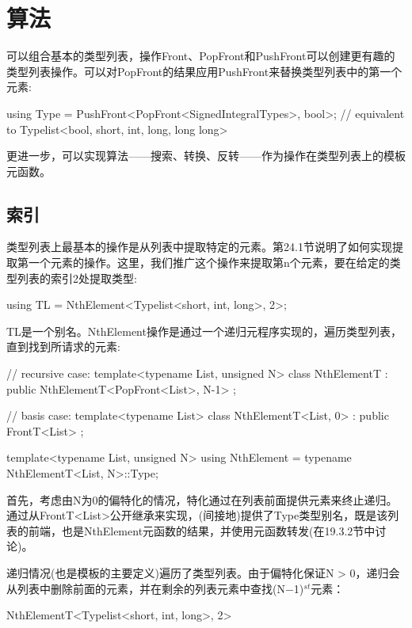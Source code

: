 \section{算法}

可以组合基本的类型列表，操作Front、PopFront和PushFront可以创建更有趣的类型列表操作。可以对PopFront的结果应用PushFront来替换类型列表中的第一个元素:

\begin{cpp}
using Type = PushFront<PopFront<SignedIntegralTypes>, bool>;
			// equivalent to Typelist<bool, short, int, long, long long>
\end{cpp}

更进一步，可以实现算法——搜索、转换、反转——作为操作在类型列表上的模板元函数。

\subsection{索引}

类型列表上最基本的操作是从列表中提取特定的元素。第24.1节说明了如何实现提取第一个元素的操作。这里，我们推广这个操作来提取第n个元素，要在给定的类型列表的索引2处提取类型:

\begin{cpp}
using TL = NthElement<Typelist<short, int, long>, 2>;
\end{cpp}

TL是一个别名。NthElement操作是通过一个递归元程序实现的，遍历类型列表，直到找到所请求的元素:

\begin{cpp}
// recursive case:
template<typename List, unsigned N>
class NthElementT : public NthElementT<PopFront<List>, N-1>
{
};

// basis case:
template<typename List>
class NthElementT<List, 0> : public FrontT<List>
{
};

template<typename List, unsigned N>
using NthElement = typename NthElementT<List, N>::Type;
\end{cpp}

首先，考虑由N为0的偏特化的情况，特化通过在列表前面提供元素来终止递归。通过从FrontT<List>公开继承来实现，(间接地)提供了Type类型别名，既是该列表的前端，也是NthElement元函数的结果，并使用元函数转发(在19.3.2节中讨论)。

递归情况(也是模板的主要定义)遍历了类型列表。由于偏特化保证N > 0，递归会从列表中删除前面的元素，并在剩余的列表元素中查找(N−1)$ ^{st} $元素：

\begin{cpp}
NthElementT<Typelist<short, int, long>, 2>
\end{cpp}

